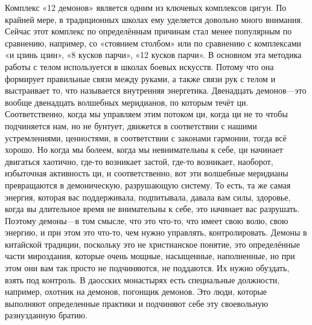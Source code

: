 Комплекс «12 демонов» является одним из ключевых комплексов цигун. По крайней мере, в
традиционных школах ему уделяется довольно много внимания. Сейчас этот комплекс по определённым
причинам
стал
менее популярным по сравнению, например, со «стоянием столбом» или по сравнению с комплексами
«и цзинь цзин», «8 кусков парчи», «12 кусков парчи». В основном эта методика
работы с телом
используется в школах боевых искусств. Потому что она формирует правильные связи между руками, а
также
связи рук с телом и выстраивает то, что называется внутренняя энергетика. Двенадцать
демонов---это вообще
двенадцать волшебных меридианов, по которым течёт ци. Соответственно, когда мы управляем этим
потоком
ци,
когда ци не то чтобы подчиняется нам, но не бунтует, движется в соответствии с нашими
устремлениями,
ценностями, в соответствии с законами гармонии,
тогда всё хорошо. Но когда мы болеем, когда мы невнимательны к себе, ци начинает двигаться
хаотично,
где-то
возникает застой, где-то возникает, наоборот, избыточная активность ци, и соответственно, вот эти
волшебные
меридианы превращаются в демоническую, разрушающую систему. То есть, та же самая энергия, которая
вас
поддерживала, подпитывала, давала вам силы, здоровье, когда вы длительное время не внимательны к
себе,
это
начинает вас разрушать. Поэтому демоны---в том смысле, что это что-то, что имеет свою волю, свою
энергию, и при этом
это что-то, чем нужно управлять, контролировать. Демоны в китайской традиции, поскольку это
не
христианское понятие, это определённые части мироздания, которые очень мощные, насыщенные,
наполненные,
но при
этом они вам так просто не подчиняются, не поддаются. Их нужно обуздать, взять под контроль. В
даосских
монастырях
есть специальные должности, например,
охотник на демонов, погонщик демонов. Это люди, которые выполняют определенные практики и подчиняют
себе эту
своевольную разнузданную братию.

